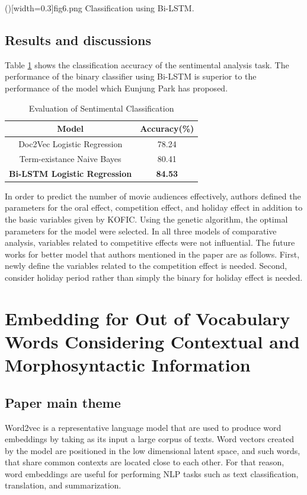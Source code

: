 \documentclass{ieeeaccess}
\begin{document}
\Figure[t]()[width=0.3\textwidth]{fig6.png}
   {Classification using Bi-LSTM.\label{fig6}}

\subsection{Results and discussions}
Table \ref{table5} shows the classification accuracy of the sentimental analysis task. 
The performance of the binary classifier using Bi-LSTM is superior to the performance of the model which Eunjung Park has proposed.

\begin{table}[t]
	\centering
	\caption{Evaluation of Sentimental Classification}
		\begin{tabular}{|c|c|}
			\hline
			\textbf{Model} 											 & \textbf{Accuracy(\%)}	\\ \hline
			Doc2Vec Logistic Regression 				 & 78.24					 				\\ \hline
			Term-existance Naive Bayes 					 & 80.41        			 	  \\ \hline
			\textbf{Bi-LSTM Logistic Regression} &  \textbf{84.53} 		  	\\ \hline
		\end{tabular}
	\label{table5}
\end{table}

In order to predict the number of movie audiences effectively, authors defined the parameters for the oral effect, competition effect, and holiday effect in addition to the basic variables given by KOFIC. 
Using the genetic algorithm, the optimal parameters for the model were selected. 
In all three models of comparative analysis, variables related to competitive effects were not influential. 
The future works for better model that authors mentioned in the paper are as follows.
First, newly define the variables related to the competition effect is needed. 
Second, consider holiday period rather than simply the binary for holiday effect is needed.


\section{Embedding for Out of Vocabulary Words Considering Contextual and Morphosyntactic Information}
\label{fourth}
\subsection{Paper main theme}
Word2vec is a representative language model that are used to produce word embeddings by taking as its input a large corpus of texts. 
Word vectors created by the model are positioned in the low dimensional latent space, and such words, that share common contexts are located close to each other. 
For that reason, word embeddings are useful for performing NLP tasks such as text classification, translation, and summarization.
\end{document}
